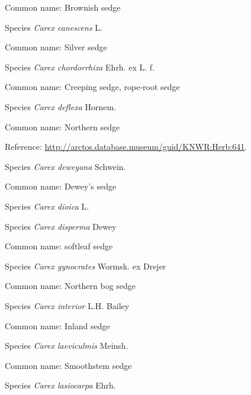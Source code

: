 \documentclass[9pt, article]{memoir}
\begin{document}
\begin{multicols}{2}
Common name: Brownish sedge

\vspace{6pt}\noindent\hspace{36pt}Species \textit{Carex canescens} L.


Common name: Silver sedge

\vspace{6pt}\noindent\hspace{36pt}Species \textit{Carex chordorrhiza} Ehrh. ex L. f.


Common name: Creeping sedge, rope-root sedge

\vspace{6pt}\noindent\hspace{36pt}Species \textit{Carex deflexa} Hornem.


Common name: Northern sedge

Reference: 
\url{http://arctos.database.museum/guid/KNWR:Herb:641}.

\vspace{6pt}\noindent\hspace{36pt}Species \textit{Carex deweyana} Schwein.


Common name: Dewey's sedge

\vspace{6pt}\noindent\hspace{36pt}Species \textit{Carex dioica} L.


\vspace{6pt}\noindent\hspace{36pt}Species \textit{Carex disperma} Dewey


Common name: softleaf sedge

\vspace{6pt}\noindent\hspace{36pt}Species \textit{Carex gynocrates} Wormsk. ex Drejer


Common name: Northern bog sedge

\vspace{6pt}\noindent\hspace{36pt}Species \textit{Carex interior} L.H. Bailey


Common name: Inland sedge

\vspace{6pt}\noindent\hspace{36pt}Species \textit{Carex laeviculmis} Meinsh.


Common name: Smoothstem sedge

\vspace{6pt}\noindent\hspace{36pt}Species \textit{Carex lasiocarpa} Ehrh.



\end{multicols}
\end{document}
